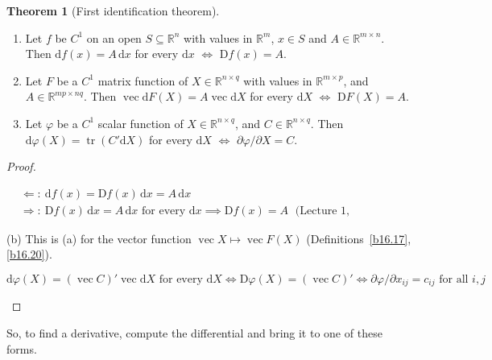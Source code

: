 \documentclass[12pt]{article}
\newcommand{\R}{\mathbb R}
\DeclareMathOperator{\tr}{tr}
\theoremstyle{definition}
\newtheorem{theorem}{Theorem}
\newcommand{\lec}[1]{Lecture~#1}
\newcommand{\boardtop}{\vspace*{-\abovedisplayskip}}
\DeclareMathOperator{\vecop}{vec}
\begin{document}
\begin{theorem}[First identification theorem]\label{b16.21}
\begin{enumerate}
\item Let \(f\) be \(C^1\) on an open \(S\subseteq\R^n\) with values in \(\R^m\), \(x\in S\) and \(A\in\R^{m\times n}\).
Then \(\mathrm{d}f(x)=A\,\mathrm{d}x\) for every \(\mathrm{d}x\) \(\iff\) \(\mathrm Df(x)=A\).
\item Let \(F\) be a \(C^1\) matrix function of \(X\in\R^{n\times q}\) with values in \(\R^{m\times p}\), and
\(A\in\R^{mp\times nq}\). Then \(\vecop\mathrm{d}F(X)=A\vecop\mathrm{d}X\) for every \(\mathrm{d}X\) \(\iff\)
\(\mathrm DF(X)=A\).
\item Let \(\varphi\) be a \(C^1\) scalar function of \(X\in\R^{n\times q}\), and \(C\in\R^{n\times q}\). Then
\(\mathrm{d}\varphi(X)=\tr(C'\mathrm{d}X)\) for every \(\mathrm{d}X\) \(\iff\) \(\partial\varphi/\partial X=C\).
\end{enumerate}
\end{theorem}
\begin{proof}
\begin{board}
\boardtop
\begin{align*}
&\Leftarrow\colon\ \mathrm{d}f(x)=\mathrm Df(x)\,\mathrm{d}x=A\,\mathrm{d}x\\
&\Rightarrow\colon\ \mathrm Df(x)\,\mathrm{d}x=A\,\mathrm{d}x\text{ for every }\mathrm{d}x\implies\mathrm Df(x)=A
&&\text{(\lec{1}, Proposition~11(b))}
\end{align*}
\end{board}
(b) This is (a) for the vector function \(\vecop X\mapsto\vecop F(X)\) (Definitions~\ref{b16.17}, \ref{b16.20}).
\begin{board}[(c) \(\tr(C'\mathrm{d}X)=(\vecop C)'\vecop\mathrm{d}X\) (Theorem~\ref{b16.7}(c)); (b) with \(m=p=1\),
\(A=(\vecop C)'\); Definition~\ref{b16.17}:]
\[
\mathrm{d}\varphi(X)=(\vecop C)'\vecop\mathrm{d}X\text{ for every }\mathrm{d}X\iff\mathrm D\varphi(X)=(\vecop C)'
\iff\partial\varphi/\partial x_{ij}=c_{ij}\text{ for all }i,j
\]
\end{board}
\nopagebreak
\end{proof}
So, to find a derivative, compute the differential and bring it to one of these forms.
\end{document}
